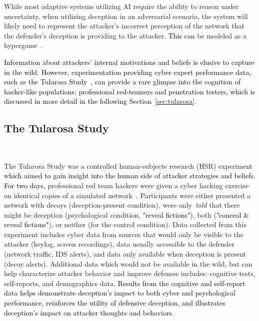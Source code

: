 \documentclass{article}
\newcommand\mmm[1]{\textcolor{black}{#1}}
\newcommand\kjf[1]{\textcolor{black}{#1}}
\newcommand\nnn[1]{\textcolor{black}{#1}}
\begin{document}
 While most adaptive systems utilizing AI require the ability to reason under uncertainty, when utilizing deception in an adversarial scenario, the system will likely need to represent the attacker's incorrect perception of the network that the defender's deception is providing to the attacker. \nnn{This can} be modeled as a hypergame~\cite{ferguson-walter_hotsos_2019}. 

\nnn{Information about attackers' internal motivations and beliefs is elusive to capture in the wild. However, experimentation \kjf{providing cyber expert performance data,} such as the Tularosa Study~\cite{tularosa2019}, can provide a rare glimpse into the cognition of hacker-like populations: professional red-teamers and penetration testers, which is discussed in more detail in the following Section~\ref{sec:tularosa}.}


%  
\subsection{The Tularosa Study}~\label{sec:tularosa}

The Tularosa Study was a controlled human-subjects research (HSR) experiment \nnn{which aimed to gain insight into the human side of attacker strategies and beliefs. For two days,} professional red team hackers were given a cyber hacking exercise on identical copies of a simulated network~\cite{tularosa2019}. Participants were either presented a network with decoys (deception-present condition), were only~\textit{told} that there might be deception (psychological condition, \mmm{"reveal fictions"}), both (\mmm{"conceal \& reveal fictions"}), or neither (for the control condition). Data collected from this experiment includes cyber data from sources that would only be visible to the attacker (keylog, screen recordings), data usually accessible to the defender (network traffic, IDS alerts), and data only available when deception is present (decoy alerts). Additional data which would not be available in the wild, but can help characterize attacker behavior and improve defenses includes: cognitive tests, self-reports, and demographics data. \nnn{Results from the cognitive and self-report data helps demonstrate deception's impact to both cyber and psychological performance, reinforces the utility of defensive deception, and illustrates deception's impact on attacker thoughts and behaviors.}
\end{document}
